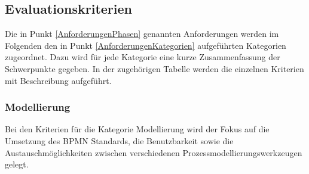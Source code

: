 \subsection{Evaluationskriterien}
\label{definitionKriterien}

Die in Punkt \ref{AnforderungenPhasen} genannten Anforderungen werden im Folgenden den in Punkt \ref{AnforderungenKategorien} aufgeführten Kategorien zugeordnet. Dazu wird für jede Kategorie eine kurze Zusammenfassung der Schwerpunkte gegeben. In der zugehörigen Tabelle werden die einzelnen Kriterien mit Beschreibung aufgeführt.



\subsubsection*{Modellierung}
Bei den Kriterien für die Kategorie Modellierung wird der Fokus auf die Umsetzung des \ac{BPMN} Standards, die Benutzbarkeit sowie die Austauschmöglichkeiten zwischen verschiedenen Prozessmodellierungswerkzeugen gelegt. 
\newpage
\small  %
\setlength\LTleft{0pt}            %
\setlength\LTright{0pt}           %
\label{kriterienModellierung}
